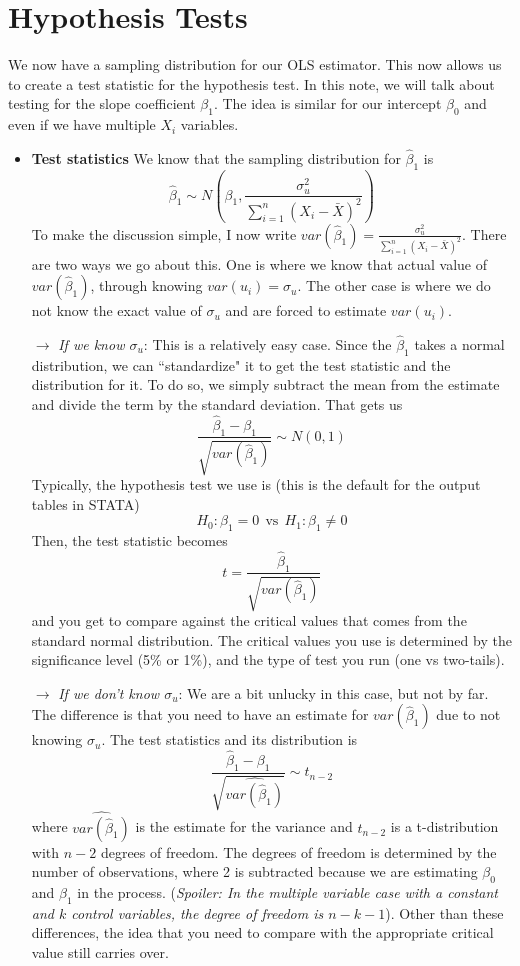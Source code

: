 \section{Hypothesis Tests}
We now have a sampling distribution for our OLS estimator. This now allows us to create a test statistic for the hypothesis test. In this note, we will talk about testing for the slope coefficient $\beta_1$. The idea is similar for our intercept $\beta_0$ and even if we have multiple $X_i$ variables. 
\begin{itemize}
\item\textbf{Test statistics} We know that the sampling distribution for $\hat{\beta}_1$ is
\[
\hat{\beta}_1 \sim N\left(\beta_1, \frac{\sigma_u^2}{\sum_{i=1}^n(X_i-\bar{X})^2}\right)
\]
To make the discussion simple, I now write $var(\hat{\beta}_1)=\frac{\sigma_u^2}{\sum_{i=1}^n(X_i-\bar{X})^2}$. There are two ways we go about this. One is where we know that actual value of $var(\hat{\beta}_1)$, through knowing $var(u_i)=\sigma_u$. The other case is where we do not know the exact value of $\sigma_u$ and are forced to estimate $var(u_i)$.
\item[$\to$] \textit{If we know $\sigma_u$}: This is a relatively easy case. Since the $\hat{\beta}_1$ takes a normal distribution, we can ``standardize" it to get the test statistic and the distribution for it. To do so, we simply subtract the mean from the estimate and divide the term by the standard deviation. That gets us
\[
\frac{\hat{\beta}_1-\beta_1}{\sqrt{var(\hat{\beta}_1)}}\sim N(0,1)
\]
Typically, the hypothesis test we use is (this is the default for the output tables in STATA)
\[
H_0: \beta_1=0 \ \ \text{vs} \ \ H_1: \beta_1\neq0
\]
Then, the test statistic becomes 
\[
t=\frac{\hat{\beta}_1}{\sqrt{var(\hat{\beta}_1)}}
\]
and you get to compare against the critical values that comes from the standard normal distribution. The critical values you use is determined by the significance level (5\% or 1\%), and the type of test you run (one vs two-tails).
\item[$\to$] \textit{If we don't know $\sigma_u$}: We are a bit unlucky in this case, but not by far. The difference is that you need to have an estimate for $var(\hat{\beta}_1)$ due to not knowing $\sigma_u$. The test statistics and its distribution is
\[
\frac{\hat{\beta}_1-\beta_1}{\sqrt{\widehat{var(\hat{\beta}_1)}}}\sim t_{n-2}
\]
where $\widehat{var(\hat{\beta}_1)}$ is the estimate for the variance and $t_{n-2}$ is a t-distribution with $n-2$ degrees of freedom. The degrees of freedom is determined by the number of observations, where 2 is subtracted because we are estimating $\beta_0$ and $\beta_1$ in the process. (\textit{Spoiler: In the multiple variable case with a constant and $k$ control variables, the degree of freedom is $n-k-1$}). Other than these differences, the idea that you need to compare with the appropriate critical value still carries over. \par\medskip

\end{itemize}
